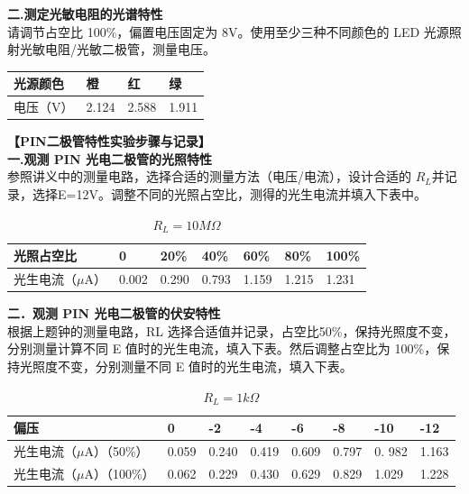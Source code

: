 \documentclass[dvipsnames, svgnames,a4paper,11pt]{article}
\begin{document}
\textbf{二.测定光敏电阻的光谱特性}\\
请调节占空比 100\%，偏置电压固定为 8V。使用至少三种不同颜色的 LED 光源照射光敏电阻/光敏二极管，测量电压。
\begin{table}[H]
	\renewcommand\arraystretch{1.7}
	\centering
	\begin{tabularx}{\textwidth}{|X|X|X|X|}
	\hline
	光源颜色&橙&红&绿\\
	\hline
	电压（V）&2.124&2.588&1.911  \\
	\hline
	\end{tabularx}
\end{table}

\textbf{【PIN二极管特性实验步骤与记录】}\\
\textbf{一.观测 PIN 光电二极管的光照特性}\\
参照讲义中的测量电路，选择合适的测量方法（电压/电流），设计合适的 $R_L$并记录，选择E=12V。调整不同的光照占空比，测得的光生电流并填入下表中。
\begin{table}[H]
	\renewcommand\arraystretch{1.7}
	\centering
	\caption{$R_L=10M\Omega$}
	\begin{tabularx}{\textwidth}{|X|X|X|X|X|X|X|}
	\hline
	光照占空比&0 &20\%& 40\%&60\%&80\%&100\%\\
	\hline
	光生电流（$\mu$A）&0.002&0.290&0.793&1.159&1.215&1.231  \\
	\hline
	\end{tabularx}
\end{table}

\textbf{二．观测 PIN 光电二极管的伏安特性}\\
根据上题钟的测量电路，RL 选择合适值并记录，占空比50\%，保持光照度不变，分别测量计算不同 E 值时的光生电流，填入下表。然后调整占空比为 100\%，保持光照度不变，分别测量不同 E 值时的光生电流，填入下表。
\begin{table}[H]
	\renewcommand\arraystretch{1.7}
	\centering
	\caption{$R_L=1k\Omega$}
	\begin{tabularx}{\textwidth}{|X|X|X|X|X|X|X|X|}
	\hline
	偏压&0 &-2&-4&-6&-8&-10&-12\\
	\hline
	光生电流（$\mu$A）（50\%）&0.059&0.240&0.419&0.609&0.797&0. 982&1.163\\
	\hline
	光生电流（$\mu$A）（100\%）&0.062&0.229&0.430&0.629&0.829&1.029&1.228\\
	\hline
	\end{tabularx}
\end{table}
\end{document}
